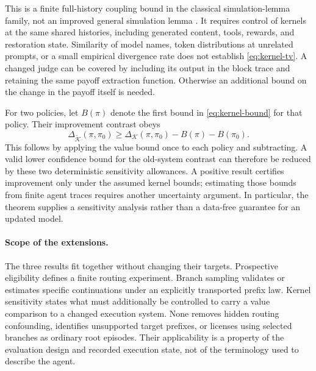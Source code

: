 This is a finite full-history coupling bound in the classical simulation-lemma family, not an improved general simulation lemma \citep{kearns2002near,lobel2024simulation}. It requires control of kernels at the same shared histories, including generated content, tools, rewards, and restoration state. Similarity of model names, token distributions at unrelated prompts, or a small empirical divergence rate does not establish \eqref{eq:kernel-tv}. A changed judge can be covered by including its output in the block trace and retaining the same payoff extraction function. Otherwise an additional bound on the change in the payoff itself is needed.

For two policies, let $B(\pi)$ denote the first bound in \eqref{eq:kernel-bound} for that policy. Their improvement contrast obeys
\begin{equation}
 \Delta_{\widetilde{\mathcal K}}(\pi,\pi_0)
 \ge\Delta_{\mathcal K}(\pi,\pi_0)-B(\pi)-B(\pi_0).
 \label{eq:robust-improvement}
\end{equation}
This follows by applying the value bound once to each policy and subtracting. A valid lower confidence bound for the old-system contrast can therefore be reduced by these two deterministic sensitivity allowances. A positive result certifies improvement only under the assumed kernel bounds; estimating those bounds from finite agent traces requires another uncertainty argument. In particular, the theorem supplies a sensitivity analysis rather than a data-free guarantee for an updated model.

\paragraph{Scope of the extensions.}
The three results fit together without changing their targets. Prospective eligibility defines a finite routing experiment. Branch sampling validates or estimates specific continuations under an explicitly transported prefix law. Kernel sensitivity states what must additionally be controlled to carry a value comparison to a changed execution system. None removes hidden routing confounding, identifies unsupported target prefixes, or licenses using selected branches as ordinary root episodes. Their applicability is a property of the evaluation design and recorded execution state, not of the terminology used to describe the agent.
